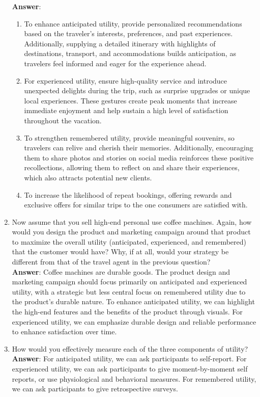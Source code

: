 \documentclass[11pt]{elegantbook}
\begin{document}
\begin{enumerate}
    \textbf{Answer}:
    \begin{enumerate}
        \item To enhance anticipated utility, provide personalized recommendations based on the traveler's interests, preferences, and past experiences. Additionally, supplying a detailed itinerary with highlights of destinations, transport, and accommodations builds anticipation, as travelers feel informed and eager for the experience ahead.
        \item For experienced utility, ensure high-quality service and introduce unexpected delights during the trip, such as surprise upgrades or unique local experiences. These gestures create peak moments that increase immediate enjoyment and help sustain a high level of satisfaction throughout the vacation.
        \item To strengthen remembered utility, provide meaningful souvenirs, so travelers can relive and cherish their memories. Additionally, encouraging them to share photos and stories on social media reinforces these positive recollections, allowing them to reflect on and share their experiences, which also attracts potential new clients.
        \item To increase the likelihood of repeat bookings, offering rewards and exclusive offers for similar trips to the one consumers are satisfied with.
    \end{enumerate}
    \item Now assume that you sell high-end personal use coffee machines. Again, how would you design the product and marketing campaign around that product to maximize the overall utility (anticipated, experienced, and remembered) that the customer would have? Why, if at all, would your strategy be different from that of the travel agent in the previous question?\\
    \textbf{Answer}: Coffee machines are durable goods. The product design and marketing campaign should focus primarily on anticipated and experienced utility, with a strategic but less central focus on remembered utility due to the product's durable nature. To enhance anticipated utility, we can highlight the high-end features and the benefits of the product through visuals. For experienced utility, we can emphasize durable design and reliable performance to enhance satisfaction over time.
    \item How would you effectively measure each of the three components of utility?
    \textbf{Answer}: For anticipated utility, we can ask participants to self-report. For experienced utility, we can ask participants to give moment-by-moment self reports, or use physiological and behavioral measures. For remembered utility, we can ask participants to give retrospective surveys.

\end{enumerate}
\end{document}
